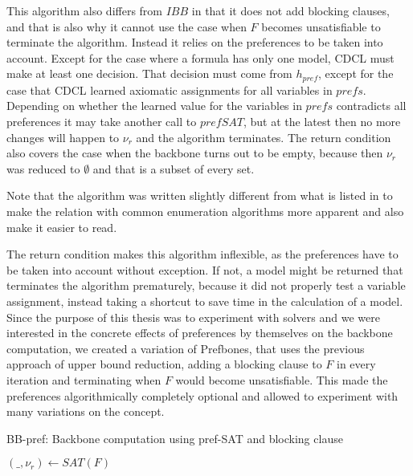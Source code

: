 This algorithm also differs from $IBB$ in that it does not add blocking clauses, and that is also why it cannot use the case when $F$ becomes unsatisfiable to terminate the algorithm. Instead it relies on the preferences to be taken into account. Except for the case where a formula has only one model, CDCL must make at least one decision. That decision must come from $h_{pref}$, except for the case that CDCL learned axiomatic assignments for all variables in $prefs$. Depending on whether the learned value for the variables in $prefs$ contradicts all preferences it may take another call to $prefSAT$, but at the latest then no more changes will happen to $\nu_r$ and the algorithm terminates. The return condition also covers the case when the backbone turns out to be empty, because then $\nu_r$ was reduced to $\emptyset$ and that is a subset of every set.

Note that the algorithm was written slightly different from what is listed in \cite{PJ18} to make the relation with common enumeration algorithms more apparent and also make it easier to read.

The return condition makes this algorithm inflexible, as the preferences have to be taken into account without exception. If not, a model might be returned that terminates the algorithm prematurely, because it did not properly test a variable assignment, instead taking a shortcut to save time in the calculation of a model. Since the purpose of this thesis was to experiment with solvers and we were interested in the concrete effects of preferences by themselves on the backbone computation, we created a variation of Prefbones, that uses the previous approach of upper bound reduction, adding a blocking clause to $F$ in every iteration and terminating when $F$ would become unsatisfiable. This made the preferences algorithmically completely optional and allowed to experiment with many variations on the concept.

\begin{algorithm}
\caption{{\sc BB-pref: Backbone computation using pref-SAT and blocking clause}}
\label{alg:blockPref}
\DontPrintSemicolon
{}

$(\_,\nu_r) \gets SAT(F)$\;

\end{algorithm}
